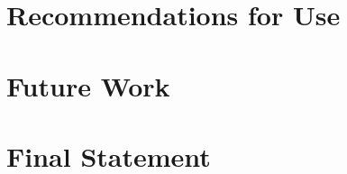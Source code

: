 %
%

\section{Recommendations for Use}
\label{sec:recommendations}


\section{Future Work}
\label{sec:future-work}


\section{Final Statement}
\label{sec:final-statement}

